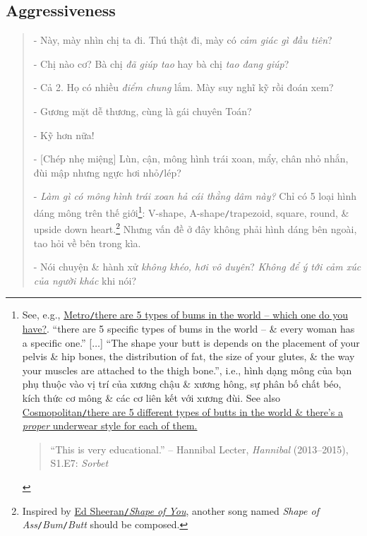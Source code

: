 \documentclass[12pt,twoside]{book}
\begin{document}
\subsection{Aggressiveness}
\begin{quotation}
	- Này, mày nhìn chị ta đi. Thú thật đi, mày có {\it cảm giác gì đầu tiên}?
	
	- Chị nào cơ? Bà chị {\it đã giúp tao} hay bà chị {\it tao đang giúp}?
	
	- Cả 2. Họ có nhiều {\it điểm chung} lắm. Mày suy nghĩ kỹ rồi đoán xem?
	
	- Gương mặt dễ thương, cùng là gái chuyên Toán?
	
	- Kỹ hơn nữa!
	
	- [Chép nhẹ miệng] Lùn, cận, mông hình trái xoan, mẩy, chân nhỏ nhắn, đùi mập nhưng ngực hơi nhỏ{\tt/}lép?
	
	- {\it Làm gì có mông hình trái xoan hả cái thằng dâm này?} Chỉ có 5 loại hình dáng mông trên thế giới\footnote{See, e.g., \href{https://metro.co.uk/2016/04/15/there-are-five-types-of-bums-in-the-world-which-one-do-you-have-5819927/}{Metro{\tt/}there are 5 types of bums in the world -- which one do you have?}. ``there are 5 specific types of bums in the world -- \& every woman has a specific one.'' [$\ldots$] ``The shape your butt is depends on the placement of your pelvis \& hip bones, the distribution of fat, the size of your glutes, \& the way your muscles are attached to the thigh bone.'', i.e., hình dạng mông của bạn phụ thuộc vào vị trí của xương chậu \& xương hông, sự phân bố chất béo, kích thức cơ mông \& các cơ liên kết với xương đùi. See also \href{https://www.cosmopolitan.com/health-fitness/a56412/there-are-5-different-types-of-butts-in-the-world/}{Cosmopolitan{\tt/}there are  5 different types of butts in the world \& there's a {\it proper} underwear style for each of them.}
		
		\begin{quotation}
			``This is very educational.'' -- Hannibal Lecter, {\it Hannibal} (2013--2015), S1.E7: {\it Sorbet}
	\end{quotation}}: V-shape, A-shape{\tt/}trapezoid, square, round, \& upside down heart.\footnote{Inspired by \href{https://www.youtube.com/watch?v=JGwWNGJdvx8}{Ed Sheeran{\tt/}{\it Shape of You}}, another song named {\it Shape of Ass}{\tt/}{\it Bum}{\tt/}{\it Butt} should be composed.} Nhưng vấn đề ở đây không phải hình dáng bên ngoài, tao hỏi về bên trong kìa.
	
	- Nói chuyện \& hành xử {\it không khéo, hơi vô duyên}? {\it Không để ý tới cảm xúc của người khác} khi nói?
	

\end{quotation}
\end{document}
